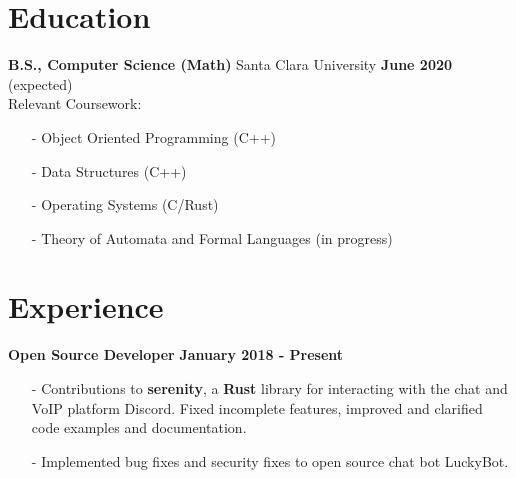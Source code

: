 \documentclass[margin,line]{res}
\begin{document}
\newcommand{\myname}{Derrick Lee}
\newlength{\mynamewidth}
\settowidth{\mynamewidth}{\namefont\myname}

\name{\hspace*{0.5\textwidth}\hspace{-0.5\mynamewidth} \myname \vspace*{.1in}}
\thispagestyle{empty}

\begin{resume}




\section{\sc Education}
{\bf B.S., Computer Science (Math)} Santa Clara University \hfill {\bf June 2020} (expected)\\
Relevant Coursework:
\begin{itemize} \itemsep -2pt
  \item[-] Object Oriented Programming (C++)
  \item[-] Data Structures (C++)
  \item[-] Operating Systems (C/Rust)
  \item[-] Theory of Automata and Formal Languages (in progress)
\end{itemize}

\section{\sc Experience}
  {\bf Open Source Developer} \hfill {\bf January 2018 - Present} \\
  \vspace{-3.5mm}
  \begin{itemize} \itemsep -2pt
    \item[-] Contributions to {\bf serenity},
    a {\bf Rust} library for interacting with the chat and VoIP platform Discord. 
    Fixed incomplete features, improved and clarified code examples and documentation.
    \item[-] Implemented bug fixes and security fixes to open source chat bot LuckyBot.
  \end{itemize}


\end{resume}
\end{document}
